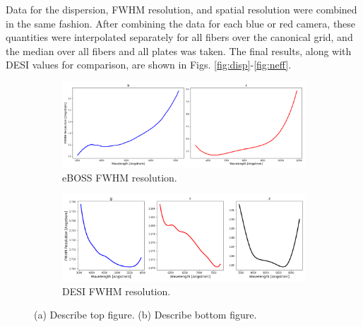 Data for the dispersion, FWHM resolution, and spatial resolution were combined in the same fashion. After combining the data for each blue or red camera, these quantities were interpolated separately for all fibers over the canonical grid, and the median over all fibers and all plates was taken. The final results, along with DESI values for comparison, are shown in Figs. \ref{fig:disp}-\ref{fig:neff}.


\begin{figure}[h]
\centering
\begin{subfigure}[b]{0.55\textwidth}
   \includegraphics[width=14cm]{images/specsim/eboss_resolution.png}
   \caption{eBOSS FWHM resolution.}
   \label{fig:eboss_fwhm} 
\label{fig:fwhm}
\end{subfigure}

\begin{subfigure}[b]{0.55\textwidth}
   \includegraphics[width=14cm]{images/specsim/desi_resolution.png}
   \caption{DESI FWHM resolution.}
   \label{fig:desi_fwhm}
\end{subfigure}
\caption[Two numerical solutions]{(a) Describe top figure. (b) Describe bottom figure.}
\end{figure}

